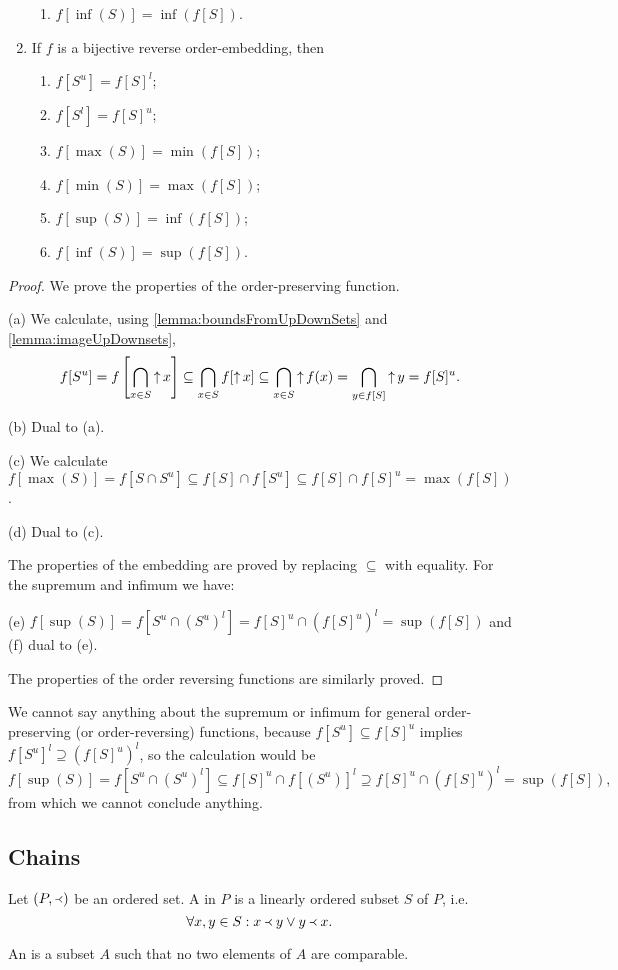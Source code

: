 \begin{lemma}
\begin{enumerate}
\begin{enumerate}
\item $f[\inf(S)] = \inf(f[S])$.
\end{enumerate}
\item If $f$ is a bijective reverse order-embedding, then
\begin{enumerate}
\item $f[S^u] = f[S]^l$;
\item $f[S^l] = f[S]^u$;
\item $f[\max(S)] = \min(f[S])$;
\item $f[\min(S)] = \max(f[S])$;
\item $f[\sup(S)] = \inf(f[S])$;
\item $f[\inf(S)] = \sup(f[S])$.
\end{enumerate}
\end{enumerate}
\end{lemma}
\begin{proof}
We prove the properties of the order-preserving function.

(a) We calculate, using \ref{lemma:boundsFromUpDownSets} and \ref{lemma:imageUpDownsets},
\[ f[S^u] = f\left[\bigcap_{x\in S}\mathop{\uparrow} x\right] \subseteq \bigcap_{x\in S}f[\mathop{\uparrow} x] \subseteq \bigcap_{x\in S}\mathop{\uparrow} f(x) = \bigcap_{y\in f[S]}\mathop{\uparrow} y =  f[S]^u. \]

(b) Dual to (a).

(c) We calculate $f[\max(S)] = f[S\cap S^u] \subseteq f[S]\cap f[S^u] \subseteq f[S]\cap f[S]^u = \max(f[S])$.

(d) Dual to (c).

The properties of the embedding are proved by replacing $\subseteq$ with equality. For the supremum and infimum we have:

(e) $f[\sup(S)] = f[S^u\cap (S^u)^l] = f[S]^u \cap (f[S]^u)^l = \sup(f[S])$ and (f) dual to (e).

The properties of the order reversing functions are similarly proved.
\end{proof}
We cannot say anything about the supremum or infimum for general order-preserving (or order-reversing) functions, because $f[S^u] \subseteq f[S]^u$ implies $f[S^u]^l \supseteq (f[S]^u)^l$, so the calculation would be
\[ f[\sup(S)] = f[S^u\cap (S^u)^l] \subseteq f[S]^u \cap f[(S^u)]^l \supseteq f[S]^u \cap (f[S]^u)^l = \sup(f[S]), \]
from which we cannot conclude anything.

\subsection{Chains}
\begin{definition}
Let $(P,\Yleft)$ be an ordered set. A  in $P$ is a linearly ordered subset $S$ of $P$, i.e.
\[ \forall x,y\in S: x\Yleft y \lor y\Yleft x. \]

An  is a subset $A$ such that no two elements of $A$ are comparable.
\end{definition}

